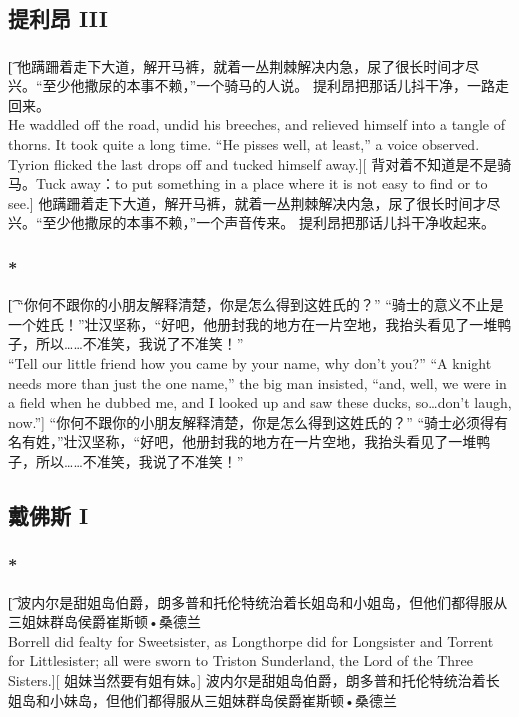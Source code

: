 \documentclass[12pt,a4paper]{article}
\begin{document}
\subsection{提利昂 III}
\subsubsection{}\t[
	他蹒跚着走下大道，解开马裤，就着一丛荆棘解决内急，尿了很长时间才尽兴。“至少他撒尿的本事不赖，”一个骑马的人说。
	提利昂把那话儿抖干净，一路走回来。\\
	He waddled off the road, undid his breeches, and relieved himself into a tangle of thorns. It took quite a long time. “He pisses well, at least,” a voice observed.
	Tyrion flicked the last drops off and tucked himself away.][
	背对着不知道是不是骑马。Tuck away：to put something in a place where it is not easy to find or to see.]
	他蹒跚着走下大道，解开马裤，就着一丛荆棘解决内急，尿了很长时间才尽兴。“至少他撒尿的本事不赖，”一个声音传来。
	提利昂把那话儿抖干净收起来。
	
\subsubsection{\color{red}*}\t[
	“你何不跟你的小朋友解释清楚，你是怎么得到这姓氏的？” “骑士的意义不止是一个姓氏！”壮汉坚称，“好吧，他册封我的地方在一片空地，我抬头看见了一堆鸭子，所以……不准笑，我说了不准笑！”\\
	“Tell our little friend how you came by your name, why don't you?” “A knight needs more than just the one name,” the big man insisted, “and, well, we were in a field when he dubbed me, and I looked up and saw these ducks, so\ldots don't laugh, now.”]
	“你何不跟你的小朋友解释清楚，你是怎么得到这姓氏的？” “骑士必须得有名有姓，”壮汉坚称，“好吧，他册封我的地方在一片空地，我抬头看见了一堆鸭子，所以……不准笑，我说了不准笑！”
	
\subsection{戴佛斯 I}
\subsubsection{\color{red}*}\t[
	 波内尔是甜姐岛伯爵，朗多普和托伦特统治着长姐岛和小姐岛，但他们都得服从三姐妹群岛侯爵崔斯顿•桑德兰\\
	 Borrell did fealty for Sweetsister, as Longthorpe did for Longsister and Torrent for Littlesister; all were sworn to Triston Sunderland, the Lord of the Three Sisters.][
	 姐妹当然要有姐有妹。]
	 波内尔是甜姐岛伯爵，朗多普和托伦特统治着长姐岛和小妹岛，但他们都得服从三姐妹群岛侯爵崔斯顿•桑德兰
	 
\end{document}

